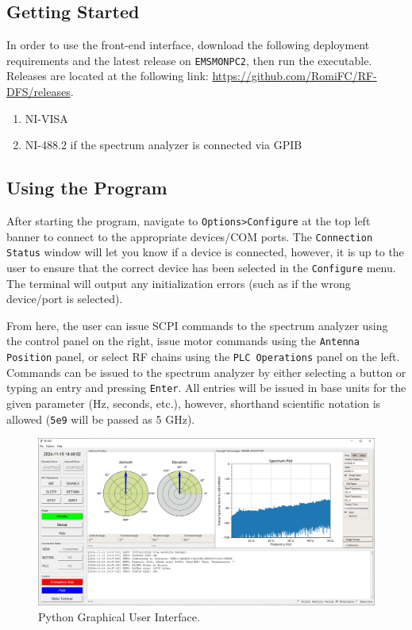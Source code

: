 \documentclass[titlepage]{article}
\begin{document}
\subsection{Getting Started}
In order to use the front-end interface, download the following deployment requirements and the latest release on \verb|EMSMONPC2|, then run the executable. Releases are located at the following link: \url{https://github.com/RomiFC/RF-DFS/releases}.
\begin{enumerate}
  \item NI-VISA
  \item NI-488.2 if the spectrum analyzer is connected via GPIB
\end{enumerate}

\subsection{Using the Program}\label{sec:usingtheprogram}
After starting the program, navigate to \verb|Options>Configure| at the top left banner to connect to the appropriate devices/COM ports. The \verb|Connection Status| window will let you know if a device is connected, however, it is up to the user to ensure that the correct device has been selected in the \verb|Configure| menu. The terminal will output any initialization errors (such as if the wrong device/port is selected).

From here, the user can issue SCPI commands to the spectrum analyzer using the control panel on the right, issue motor commands using the \verb|Antenna Position| panel, or select RF chains using the \verb|PLC Operations| panel on the left. Commands can be issued to the spectrum analyzer by either selecting a button or typing an entry and pressing \verb|Enter|. All entries will be issued in base units for the given parameter (Hz, seconds, etc.), however, shorthand scientific notation is allowed (\verb|5e9| will be passed as 5 GHz).
\begin{figure}
  \begin{center}
    \includegraphics[width=\textwidth]{images/3gui.png}
  \end{center}
  \caption{Python Graphical User Interface.}\label{fig:gui}
\end{figure}
\end{document}
